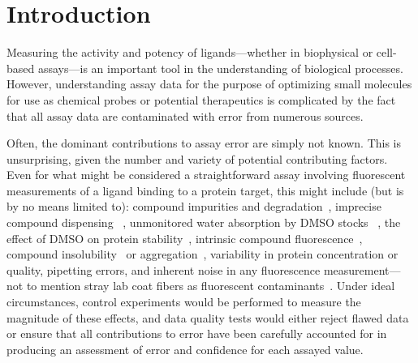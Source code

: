 \documentclass[aps,pre,twocolumn,nofootinbib,superscriptaddress,linenumbers]{revtex4-1}
\begin{document}
\section{Introduction}
\label{section:introduction}

Measuring the activity and potency of ligands---whether in biophysical or cell-based assays---is an important tool in the understanding of biological processes.
However, understanding assay data for the purpose of optimizing small molecules for use as chemical probes or potential therapeutics is complicated by the fact that all assay data are contaminated with error from numerous sources.

Often, the dominant contributions to assay error are simply not known.
This is unsurprising, given the number and variety of potential contributing factors.
Even for what might be considered a straightforward assay involving fluorescent measurements of a ligand binding to a protein target, this might include (but is by no means limited to): compound impurities and degradation~\cite{kozikowski_effect_2003,kozikowski_effect_2003-1,cheng_studies_2003,waybright_overcoming_2009}, imprecise compound dispensing  ~\cite{harris_gradient_2010,grant_achieving_2009}, unmonitored water absorption by DMSO stocks ~\cite{waybright_overcoming_2009}, the effect of DMSO on protein stability~\cite{tjernberg_dmso-related_2005}, intrinsic compound fluorescence~\cite{simeonov_fluorescence_2008,baell_new_2010}, compound insolubility~\cite{di_biological_2006} or aggregation~\cite{mcgovern_common_2002,mcgovern_kinase_2003,feng_high-throughput_2005,feng_synergy_2006,baell_new_2010}, variability in protein concentration or quality, pipetting errors, and inherent noise in any fluorescence measurement---not to mention stray lab coat fibers as fluorescent contaminants~\cite{busch_does_2015}. 
Under ideal circumstances, control experiments would be performed to measure the magnitude of these effects, and data quality tests would either reject flawed data or ensure that all contributions to error have been carefully accounted for in producing an assessment of error and confidence for each assayed value.
\end{document}

